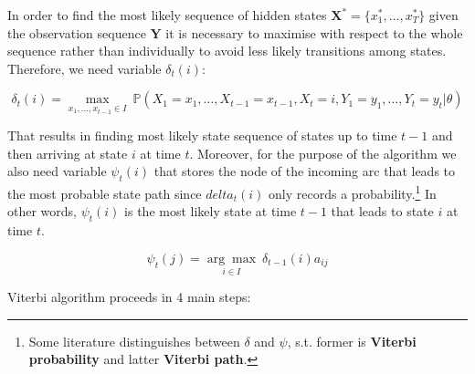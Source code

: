 In order to find the most likely sequence of hidden states $\textbf{X}^*=\{x_1^*,\ldots,x_T^*\}$ given the observation sequence $\textbf{Y}$ it is necessary 
to maximise with respect to the whole sequence rather than individually to avoid less likely transitions among states.
Therefore, we need variable $\delta_t(i)$:

\begin{equation}
    \delta_t(i) = \underset{x_1,\ldots,x_{t-1} \in I}{\max}\: \mathbb{P}(X_1=x_1,\ldots,X_{t-1}=x_{t-1},X_t=i,Y_1 = y_1,\ldots,Y_{t}=y_t|\theta)
\end{equation}

That results in finding most likely state sequence of states up to time $t-1$ and then arriving at state $i$ at time $t$. Moreover, for the purpose of the algorithm we also need variable $\psi_t(i)$ 
that stores the node of the incoming arc that leads to the most probable state path since $delta_t(i)$ only records a probability.\footnote{Some literature distinguishes between $\delta$ and $\psi$, s.t. former is \textbf{Viterbi probability} and latter \textbf{Viterbi path}.} 
In other words, $\psi_t(i)$ is the most likely state at time $t-1$ that leads to state $i$ at time $t$.

\begin{equation}
\psi_t(j) = \underset{i \in I}{\arg\max} \: \delta_{t-1}(i)a_{ij}
\end{equation}

\noindent Viterbi algorithm proceeds in 4 main steps:

